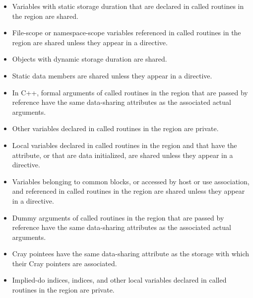 {{{{\ccppspecificstart
\begin{itemize}
\item Variables with static storage duration that are declared in called routines in the region 
are shared.

\item File-scope or namespace-scope variables referenced in called routines in the region 
are shared unless they appear in a  directive.

\item Objects with dynamic storage duration are shared.

\item Static data members are shared unless they appear in a  directive.

\item In C++, formal arguments of called routines in the region that are passed by reference have the same data-sharing attributes as the associated actual arguments. 

\item Other variables declared in called routines in the region are private.
\end{itemize}
\ccppspecificend

\fortranspecificstart
\begin{itemize}
\item Local variables declared in called routines in the region and that have the  
attribute, or that are data initialized, are shared unless they appear in a 
 directive.

\item Variables belonging to common blocks, or accessed by host or use association, and referenced in called routines in the region are shared unless they appear in a  directive. 

\item Dummy arguments of called routines in the region that are passed by reference have the same data-sharing attributes as the associated actual arguments. 

\item Cray pointees have the same data-sharing attribute as the storage with which their Cray pointers are associated.

\item Implied-do indices,  indices, and other local variables declared in called 
routines in the region are private. 
\end{itemize}
\fortranspecificend









}}}}
